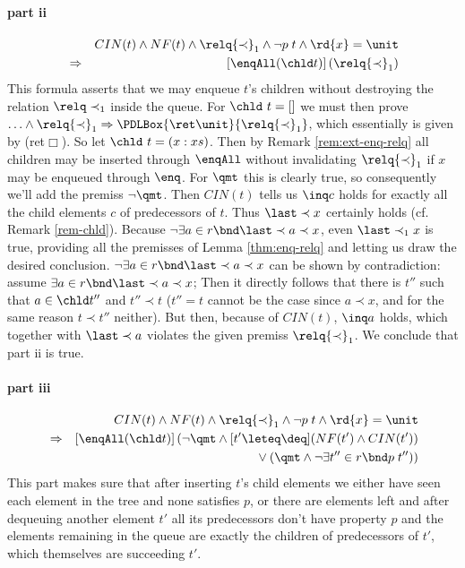 \paragraph{part ii}
\begin{eqnarray*}
  && CIN(t) \land NF(t) \land \relq {\prec}_1 \land \lnot p\;t \land \rd{x} = 
  \unit \\
  &\Rightarrow& [\enqAll (\chld t)]\,(\relq {\prec}_1)
\end{eqnarray*}
This formula asserts that we may enqueue $t$'s children without destroying the
relation $\relq \prec_1$ inside the queue. For $\chld\ t = []$ we must then prove $\ldots
\land \relq{\prec}_1 \Rightarrow \PDLBox{\ret\unit}{\relq{\prec}_1}$, which essentially is given by
(ret$\Box$). So let $\chld\ t = (x:xs)$.  Then by Remark \ref{rem:ext-enq-relq} all
children may be inserted through $\enqAll$ without invalidating $\relq {\prec}_1$ if
$x$ may be enqueued through $\enq$. For $\qmt$ this is clearly true, so
consequently we'll add the premiss $\lnot \qmt$. Then $CIN(t)$ tells us $\inq c$
holds for exactly all the child elements $c$ of predecessors of $t$. Thus $\last
\prec x$ certainly holds (cf. Remark \ref{rem-chld}). Because $\lnot \exists a\in r\bnd \last \prec
a \prec x$, even $\last \prec_1 x$ is true, providing all the premisses of Lemma
\ref{thm:enq-relq} and letting us draw the desired conclusion. $\lnot \exists a\in r\bnd
\last \prec a \prec x$ can be shown by contradiction: assume $\exists a\in r\bnd \last \prec a \prec x$;
Then it directly follows that there is $t''$ such that $a \in \chld t''$ and $t''
\prec t$ ($t'' = t$ cannot be the case since $a \prec x$, and for the same reason $t \prec
t''$ neither). But then, because of $CIN(t)$, $\inq a$ holds, which together
with $\last \prec a$ violates the given premiss $\relq {\prec}_1$. We conclude that
part ii is true.

\paragraph{part iii}
\begin{eqnarray*}
&& CIN(t) \land NF(t) \land \relq {\prec}_1 \land \lnot p\;t \land \rd{x} =  \unit\\
&\Rightarrow& [\enqAll (\chld t)]\,(\lnot \qmt \land [t' \leteq \deq](NF(t') \land CIN(t')) \\
&& \qquad  {}\lor (\qmt \land \lnot \exists t''\in r\bnd p\;t''))
\end{eqnarray*}
This part makes sure that after inserting $t$'s child elements we either have seen
each element in the tree and none satisfies $p$, or there are elements left and
after dequeuing another element $t'$ all its predecessors don't have property
$p$ and the elements remaining in the queue are exactly the children of
predecessors of $t'$, which themselves are succeeding $t'$.

